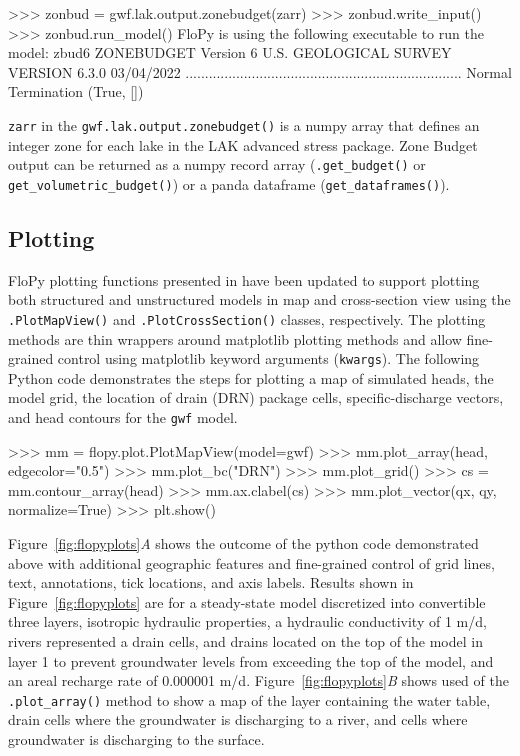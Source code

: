 \documentclass[11pt, oneside]{article}  	%
\begin{document}
\begin{python}
>>> zonbud = gwf.lak.output.zonebudget(zarr)
>>> zonbud.write_input()
>>> zonbud.run_model()
FloPy is using the following executable to run the model: zbud6
                    ZONEBUDGET Version 6
                   U.S. GEOLOGICAL SURVEY
                  VERSION 6.3.0 03/04/2022
.......................................................................
Normal Termination
(True, [])
\end{python}

\noindent \texttt{zarr} in the \texttt{gwf.lak.output.zonebudget()} is a numpy array that defines an integer zone for each lake in the LAK advanced stress package. Zone Budget output can be returned as a numpy record array (\texttt{.get\_budget()} or \texttt{get\_volumetric\_budget()}) or a panda dataframe (\texttt{get\_dataframes()}).

\subsection{Plotting} \label{sec:plotting}

FloPy plotting functions presented in \cite{bakker2016scripting} have been updated to support plotting both structured and unstructured models in map and cross-section view using the \texttt{.PlotMapView()} and \texttt{.PlotCrossSection()} classes, respectively. The plotting methods are thin wrappers around matplotlib plotting methods and allow fine-grained control using matplotlib keyword arguments (\texttt{kwargs}). The following Python code demonstrates the steps for plotting a map of simulated heads, the model grid, the location of drain (DRN) package cells, specific-discharge vectors, and head contours for the \texttt{gwf} model.

\begin{python}
>>> mm = flopy.plot.PlotMapView(model=gwf)
>>> mm.plot_array(head, edgecolor="0.5")
>>> mm.plot_bc("DRN")
>>> mm.plot_grid()
>>> cs = mm.contour_array(head)
>>> mm.ax.clabel(cs)
>>> mm.plot_vector(qx, qy, normalize=True)
>>> plt.show()
\end{python}

\noindent Figure~\ref{fig:flopyplots}\textit{A} shows the outcome of the python code demonstrated above with additional geographic features and fine-grained control of grid lines, text, annotations, tick locations, and axis labels. Results shown in Figure~\ref{fig:flopyplots} are for a steady-state model discretized into convertible three layers, isotropic hydraulic properties, a hydraulic conductivity of 1 m/d, rivers represented a drain cells, and drains located on the top of the model in layer 1 to prevent groundwater levels from exceeding the top of the model, and an areal recharge rate of 0.000001 m/d. Figure~\ref{fig:flopyplots}\textit{B} shows used of the \texttt{.plot\_array()} method to show a map of the layer containing the water table, drain cells where the groundwater is discharging to a river, and cells where groundwater is discharging to the surface.
\end{document}

